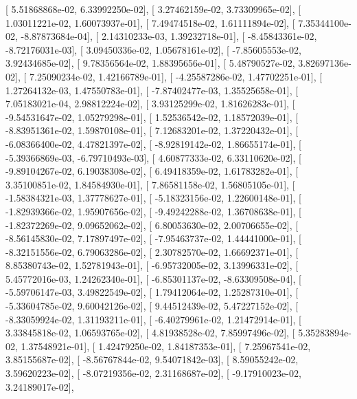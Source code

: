 \documentclass{article}
\begin{document}
       [  5.51868868e-02,   6.33992250e-02],
       [  3.27462159e-02,   3.73309965e-02],
       [  1.03011221e-02,   1.60073937e-01],
       [  7.49474518e-02,   1.61111894e-02],
       [  7.35344100e-02,  -8.87873684e-04],
       [  2.14310233e-03,   1.39232718e-01],
       [ -8.45843361e-02,  -8.72176031e-03],
       [  3.09450336e-02,   1.05678161e-02],
       [ -7.85605553e-02,   3.92434685e-02],
       [  9.78356564e-02,   1.88395656e-01],
       [  5.48790527e-02,   3.82697136e-02],
       [  7.25090234e-02,   1.42166789e-01],
       [ -4.25587286e-02,   1.47702251e-01],
       [  1.27264132e-03,   1.47550783e-01],
       [ -7.87402477e-03,   1.35525658e-01],
       [  7.05183021e-04,   2.98812224e-02],
       [  3.93125299e-02,   1.81626283e-01],
       [ -9.54531647e-02,   1.05279298e-01],
       [  1.52536542e-02,   1.18572039e-01],
       [ -8.83951361e-02,   1.59870108e-01],
       [  7.12683201e-02,   1.37220432e-01],
       [ -6.08366400e-02,   4.47821397e-02],
       [ -8.92819142e-02,   1.86655174e-01],
       [ -5.39366869e-03,  -6.79710493e-03],
       [  4.60877333e-02,   6.33110620e-02],
       [ -9.89104267e-02,   6.19038308e-02],
       [  6.49418359e-02,   1.61783282e-01],
       [  3.35100851e-02,   1.84584930e-01],
       [  7.86581158e-02,   1.56805105e-01],
       [ -1.58384321e-03,   1.37778627e-01],
       [ -5.18323156e-02,   1.22600148e-01],
       [ -1.82939366e-02,   1.95907656e-02],
       [ -9.49242288e-02,   1.36708638e-01],
       [ -1.82372269e-02,   9.09652062e-02],
       [  6.80053630e-02,   2.00706655e-02],
       [ -8.56145830e-02,   7.17897497e-02],
       [ -7.95463737e-02,   1.44441000e-01],
       [ -8.32151556e-02,   6.79063286e-02],
       [  2.30782570e-02,   1.66692371e-01],
       [  8.85380743e-02,   1.52781943e-01],
       [ -6.95732005e-02,   3.13996331e-02],
       [  5.45772016e-03,   1.24262340e-01],
       [ -6.85301137e-02,  -8.63309508e-04],
       [ -5.59706147e-03,   3.49822549e-02],
       [  1.79412064e-02,   1.25287310e-01],
       [ -5.33604785e-02,   9.60042126e-02],
       [  9.44512439e-02,   5.47227152e-02],
       [ -8.33059924e-02,   1.31193211e-01],
       [ -6.40279961e-02,   1.21472914e-01],
       [  3.33845818e-02,   1.06593765e-02],
       [  4.81938528e-02,   7.85997496e-02],
       [  5.35283894e-02,   1.37548921e-01],
       [  1.42479250e-02,   1.84187353e-01],
       [  7.25967541e-02,   3.85155687e-02],
       [ -8.56767844e-02,   9.54071842e-03],
       [  8.59055242e-02,   3.59620223e-02],
       [ -8.07219356e-02,   2.31168687e-02],
       [ -9.17910023e-02,   3.24189017e-02],
\end{document}

